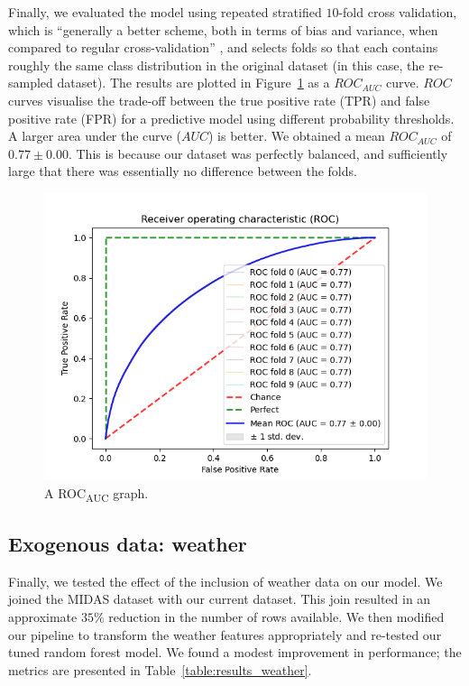 \documentclass[12pt,a4paper]{article}
\begin{document}
Finally, we evaluated the model using repeated stratified $10$-fold cross validation, which is “generally a better scheme, both in terms of bias and variance, when compared to regular cross-validation” \cite{kohavi_1995}, and selects folds so that each contains roughly the same class distribution in the original dataset (in this case, the re-sampled dataset). The results are plotted in Figure~\ref{fig:roc} as a $ROC_{AUC}$ curve. $ROC$ curves visualise the trade-off between the true positive rate (TPR) and false positive rate (FPR) for a predictive model using different probability thresholds. A larger area under the curve ($AUC$) is better. We obtained a mean $ROC_{AUC}$ of $0.77 \pm 0.00$. This is because our dataset was perfectly balanced, and sufficiently large that there was essentially no difference between the folds.  

\begin{figure}[h]
  \includegraphics[width=\linewidth]{images/roc_auc_10.png}
  \caption{A ROC\textsubscript{AUC} graph.}
  \label{fig:roc}
\end{figure}

\subsection{Exogenous data: weather}

Finally, we tested the effect of the inclusion of weather data on our model. We joined the MIDAS dataset with our current dataset. This join resulted in an approximate $35\%$ reduction in the number of rows available. We then modified our pipeline to transform the weather features appropriately and re-tested our tuned random forest model. We found a modest improvement in performance; the metrics are presented in Table~\ref{table:results_weather}.
\end{document}
